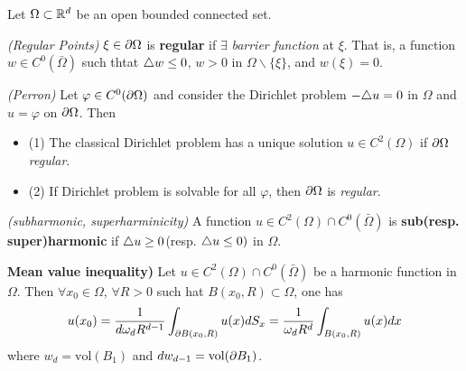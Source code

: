 \documentclass[12pt,a4paper]{article}
\renewenvironment{i}
{\begin{itemize} 
	}%
	{\end{itemize}
}
\begin{document}
Let $\Omega \subset \mathbb{R}^d$ be an open bounded connected set.
\s

 \emph{(Regular Points)} $\xi \in \partial \Omega$ is \textbf{regular} if $\exists$ \emph{barrier function} at $\xi$. That is, a function $w\in C^0 (\bar{\Omega})$ such thtat $\triangle w \leq 0$, $w>0$ in $\Omega \backslash \{\xi\}$, and $w(\xi)=0$.
\s

\thm \emph{(Perron)} Let $\varphi \in C^0 (\partial \Omega)$ and consider the Dirichlet problem $-\triangle u =0$ in $\Omega$ and $u=\varphi$ on $\partial \Omega$. Then
\begin{i}
\item[(1)] The classical Dirichlet problem has a unique solution $u\in C^2(\Omega)$ if $\partial \Omega$ \emph{regular}.
\item[(2)] If Dirichlet problem is solvable for all $\varphi$, then $\partial \Omega$ is \emph{regular}.
\end{i}
\s

 \emph{(subharmonic, superharminicity)} A function $u\in C^2(\Omega) \cap C^0(\bar{\Omega})$ is \textbf{sub(resp. super)harmonic} if $\triangle u\geq 0$(resp. $\triangle u \leq 0)$ in $\Omega$.
\s

\textbf{Mean value inequality)} Let $u\in C^2(\Omega) \cap C^0(\bar{\Omega})$ be a harmonic function in $\Omega$. Then $\forall x_0 \in \Omega$, $\forall R>0$ such hat $B(x_0, R) \subset \Omega$, one has
\begin{align*}
u(x_0) = \frac{1}{d\omega_d R^{d-1}} \int_{\partial B(x_0, R)} u(x) dS_x = \frac{1}{\omega_d R^d} \int_{B(x_0, R)} u(x)dx
\end{align*}
where $w_d = \text{vol}(B_1)$ and $dw_{d-1} = \text{vol}(\partial B_1)$.
\end{document}
